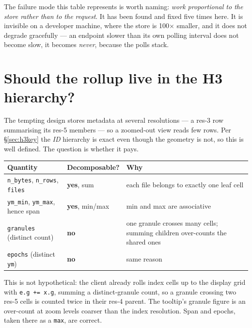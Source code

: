 \documentclass[11pt,a4paper]{article}
\newcommand{\code}[1]{\texttt{\small #1}}
\newcommand{\col}[1]{\texttt{\footnotesize #1}}
\begin{document}
\noindent
The failure mode this table represents is worth naming: \emph{work proportional to the store rather than to
the request}. It has been found and fixed five times here. It is invisible on a developer machine, where the
store is 100$\times$ smaller, and it does not degrade gracefully --- an endpoint slower than its own polling
interval does not become slow, it becomes \emph{never}, because the polls stack.

\section{Should the rollup live in the H3 hierarchy?}
\label{sec:h3}

The tempting design stores metadata at several resolutions --- a res-3 row summarising its res-5 members ---
so a zoomed-out view reads few rows. Per \S\ref{sec:h3key} the \emph{ID} hierarchy is exact even though the
geometry is not, so this is well defined. The question is whether it pays.

\begin{center}\small
\begin{tabular}{@{}llp{72mm}@{}}
\toprule
\textbf{Quantity} & \textbf{Decomposable?} & \textbf{Why} \\
\midrule
\col{n\_bytes}, \col{n\_rows}, \col{files} & \textbf{yes}, sum & each file belongs to exactly one leaf cell \\
\col{ym\_min}, \col{ym\_max}, hence span   & \textbf{yes}, min/max & min and max are associative \\
\col{granules} (distinct count)             & \textbf{no}    & one granule crosses many cells; summing
                                                               children over-counts the shared ones \\
\col{epochs} (distinct \code{ym})           & \textbf{no}    & same reason \\
\bottomrule
\end{tabular}
\end{center}

\noindent
This is not hypothetical: the client already rolls index cells up to the display grid with \code{e.g += x.g},
summing a distinct-granule count, so a granule crossing two res-5 cells is counted twice in their res-4
parent. The tooltip's granule figure is an over-count at zoom levels coarser than the index resolution. Span
and epochs, taken there as a \code{max}, are correct.
\end{document}
